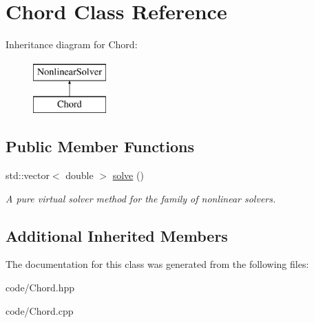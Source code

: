 \hypertarget{class_chord}{}\section{Chord Class Reference}
\label{class_chord}
Inheritance diagram for Chord\+:\begin{figure}[H]
\begin{center}
\leavevmode
\includegraphics[height=2.000000cm]{class_chord}
\end{center}
\end{figure}
\subsection*{Public Member Functions}
\begin{DoxyCompactItemize}
\item 
std\+::vector$<$ double $>$ \hyperlink{class_chord_afeef60163eedd77ce2dc75e704c267dd}{solve} ()\hypertarget{class_chord_afeef60163eedd77ce2dc75e704c267dd}{}\label{class_chord_afeef60163eedd77ce2dc75e704c267dd}

\begin{DoxyCompactList}\small\item\em A pure virtual solver method for the family of nonlinear solvers. \end{DoxyCompactList}\end{DoxyCompactItemize}
\subsection*{Additional Inherited Members}


The documentation for this class was generated from the following files\+:\begin{DoxyCompactItemize}
\item 
code/Chord.\+hpp\item 
code/Chord.\+cpp\end{DoxyCompactItemize}
